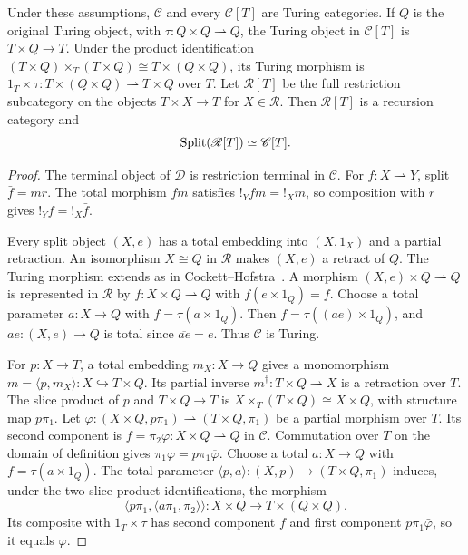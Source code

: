 \begin{lemma}
\label{lem:partial-slice-turing}
Under these assumptions, $\mathscr C$ and every $\mathscr C[T]$ are
Turing categories. If $Q$ is the original Turing object, with
$\tau:Q\times Q\rightharpoonup Q$, the Turing object in $\mathscr C[T]$
is $T\times Q\to T$. Under the product identification
$(T\times Q)\times_T(T\times Q)\cong T\times(Q\times Q)$, its
Turing morphism is
$1_T\times\tau:T\times(Q\times Q)\rightharpoonup T\times Q$ over $T$.
Let $\mathscr R[T]$ be the full restriction subcategory on the objects
$T\times X\to T$ for $X\in\mathscr R$. Then $\mathscr R[T]$ is a
recursion category and
\[
 \operatorname{Split}(\mathscr R[T])\simeq\mathscr C[T].
\]
\end{lemma}
\begin{proof}
The terminal object of $\mathcal D$ is restriction terminal in
$\mathscr C$. For $f:X\rightharpoonup Y$, split $\bar f=mr$.
The total morphism $fm$ satisfies $!_Yfm=!_Xm$, so composition with
$r$ gives $!_Yf=!_X\bar f$.

Every split object $(X,e)$ has a total embedding into $(X,1_X)$
and a partial retraction. An isomorphism $X\cong Q$ in $\mathscr R$
makes $(X,e)$ a retract of $Q$. The Turing morphism extends as in
Cockett--Hofstra~\cite[Section 3.5]{CockettHofstra}.
A morphism $(X,e)\times Q\rightharpoonup Q$ is represented in $\mathscr R$
by $f:X\times Q\rightharpoonup Q$ with $f(e\times1_Q)=f$.
Choose a total parameter $a:X\to Q$ with $f=\tau(a\times1_Q)$.
Then $f=\tau((ae)\times1_Q)$, and $ae:(X,e)\to Q$ is total since
$\overline{ae}=e$.
Thus $\mathscr C$ is Turing.

For $p:X\to T$, a total embedding $m_X:X\to Q$ gives a monomorphism
$m=\langle p,m_X\rangle:X\hookrightarrow T\times Q$. Its partial inverse
$m^\dagger:T\times Q\rightharpoonup X$ is a retraction over $T$.
The slice product of $p$ and $T\times Q\to T$ is
$X\times_T(T\times Q)\cong X\times Q$, with structure map $p\pi_1$.
Let $\varphi:(X\times Q,p\pi_1)\rightharpoonup(T\times Q,\pi_1)$
be a partial morphism over $T$. Its second component is
$f=\pi_2\varphi:X\times Q\rightharpoonup Q$ in $\mathscr C$.
Commutation over $T$ on the domain of definition gives
$\pi_1\varphi=p\pi_1\overline\varphi$.
Choose a total $a:X\to Q$ with $f=\tau(a\times1_Q)$. The total
parameter $\langle p,a\rangle:(X,p)\to(T\times Q,\pi_1)$ induces,
under the two slice product identifications, the morphism
\[
 \langle p\pi_1,\langle a\pi_1,\pi_2\rangle\rangle:
 X\times Q\longrightarrow T\times(Q\times Q).
\]
Its composite with $1_T\times\tau$ has second component $f$ and first
component $p\pi_1\bar\varphi$, so it equals $\varphi$.


\end{proof}
